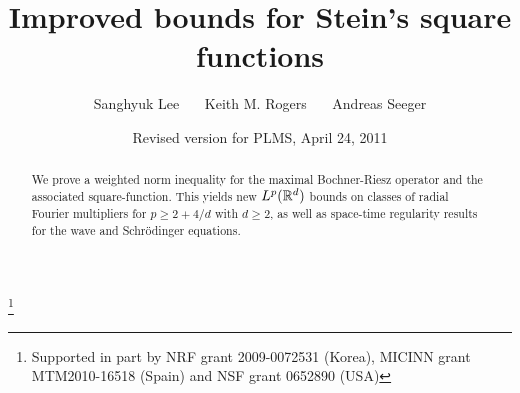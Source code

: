 \documentclass[11pt]{amsart}
\theoremstyle{definition}
\numberwithin{theorem}{section}
\numberwithin{definition}{section}
\newcommand{\note}[1]{\footnote{\texttt{\Small #1}}}
\begin{document}
\newcommand{\NN}{\mathbb{N}}

\newcommand{\B}{\mathbb{B}}
\newcommand{\SSS}{\mathbb{S}}







\title[Improved  bounds for Stein's square functions]
{Improved  bounds for Stein's square functions}


\thanks{Supported in part by NRF grant 2009-0072531 (Korea),
MICINN grant MTM2010-16518 (Spain) and NSF grant 0652890 (USA)}
\date{Revised version for PLMS, April 24, 2011}

\author[S. Lee \ \ \ \ K. Rogers \ \ \ \  A. Seeger]{Sanghyuk Lee \ \ \
Keith M. Rogers \ \ \ Andreas Seeger}

\address{Sanghyuk Lee\\ School of Mathematical Sciences,
Seoul National University, Seoul 151-742, Korea}

\address{Keith Rogers \\
Instituto de Ciencias Matematicas
CSIC-UAM-UC3M-UCM \\ Madrid 28049, Spain} 

\address{Andreas Seeger \\ Department of Mathematics 
\\ University of Wisconsin--Madison\\
480 Lincoln Drive\\
Madison, WI, 53706, USA} 




\begin{abstract} We prove a weighted norm inequality for the maximal Bochner-Riesz operator and the associated square-function. This yields new
$L^p(\Bbb R^d)$ bounds on classes of radial Fourier multipliers
 for $p\ge 2+4/d$ with $d\ge 2$,
as well as space-time regularity results for the wave and
Schr\"odinger
equations.
 \end{abstract}

\maketitle
\end{document}
